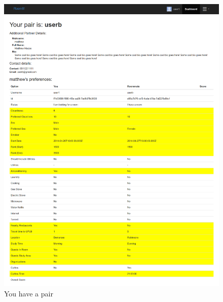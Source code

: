 \documentclass[journal]{IEEEtran}
\begin{document}
    \begin{figure}
        \centering
            \includegraphics[scale=0.17]{pair.png}
            \caption{You have a pair}
            \label{Pair}
    \end{figure}
\end{document}
